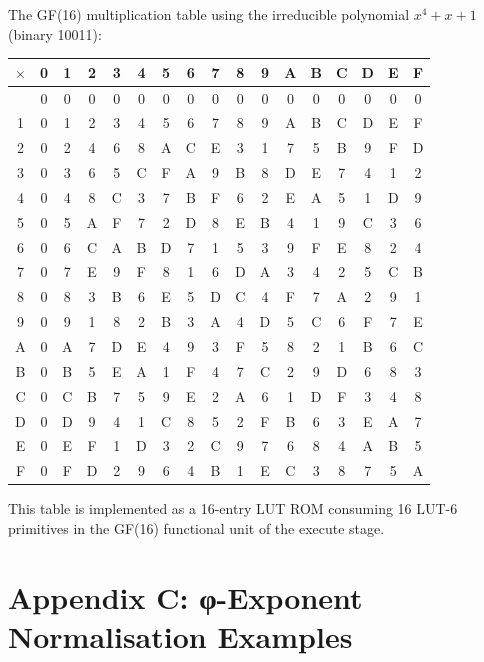 The GF(16) multiplication table using the irreducible polynomial
\(x^4 + x + 1\) (binary 10011):

\begin{longtable}[]{@{}c|cccccccccccccccc@{}}
\toprule\noalign{}
$\times$ & 0 & 1 & 2 & 3 & 4 & 5 & 6 & 7 & 8 & 9 & A & B & C & D & E & F \\
\midrule\noalign{}
\endhead
\bottomrule\noalign{}
\endlastfoot
0 & 0 & 0 & 0 & 0 & 0 & 0 & 0 & 0 & 0 & 0 & 0 & 0 & 0 & 0 & 0 & 0 \\
1 & 0 & 1 & 2 & 3 & 4 & 5 & 6 & 7 & 8 & 9 & A & B & C & D & E & F \\
2 & 0 & 2 & 4 & 6 & 8 & A & C & E & 3 & 1 & 7 & 5 & B & 9 & F & D \\
3 & 0 & 3 & 6 & 5 & C & F & A & 9 & B & 8 & D & E & 7 & 4 & 1 & 2 \\
4 & 0 & 4 & 8 & C & 3 & 7 & B & F & 6 & 2 & E & A & 5 & 1 & D & 9 \\
5 & 0 & 5 & A & F & 7 & 2 & D & 8 & E & B & 4 & 1 & 9 & C & 3 & 6 \\
6 & 0 & 6 & C & A & B & D & 7 & 1 & 5 & 3 & 9 & F & E & 8 & 2 & 4 \\
7 & 0 & 7 & E & 9 & F & 8 & 1 & 6 & D & A & 3 & 4 & 2 & 5 & C & B \\
8 & 0 & 8 & 3 & B & 6 & E & 5 & D & C & 4 & F & 7 & A & 2 & 9 & 1 \\
9 & 0 & 9 & 1 & 8 & 2 & B & 3 & A & 4 & D & 5 & C & 6 & F & 7 & E \\
A & 0 & A & 7 & D & E & 4 & 9 & 3 & F & 5 & 8 & 2 & 1 & B & 6 & C \\
B & 0 & B & 5 & E & A & 1 & F & 4 & 7 & C & 2 & 9 & D & 6 & 8 & 3 \\
C & 0 & C & B & 7 & 5 & 9 & E & 2 & A & 6 & 1 & D & F & 3 & 4 & 8 \\
D & 0 & D & 9 & 4 & 1 & C & 8 & 5 & 2 & F & B & 6 & 3 & E & A & 7 \\
E & 0 & E & F & 1 & D & 3 & 2 & C & 9 & 7 & 6 & 8 & 4 & A & B & 5 \\
F & 0 & F & D & 2 & 9 & 6 & 4 & B & 1 & E & C & 3 & 8 & 7 & 5 & A \\
\end{longtable}

This table is implemented as a 16-entry LUT ROM consuming 16
LUT-6 primitives in the GF(16) functional unit of the execute
stage.

\section{Appendix C: φ-Exponent Normalisation Examples}\label{fa_71:appx-phi-examples}

